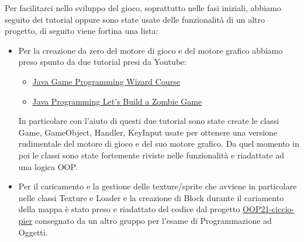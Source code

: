 \documentclass[a4paper,12pt]{report}
\begin{document}
Per facilitarci nello sviluppo del gioco, soprattutto nelle fasi iniziali, abbiamo seguito dei tutorial oppure sono state usate delle funzionalità di un altro progetto, di seguito viene fortina una lista:
\begin{itemize}
	\item Per la creazione da zero del motore di gioco e del motore grafico abbiamo preso spunto da due tutorial presi da Youtube: 
	 \begin{itemize}
	 	\item \href{https://www.youtube.com/playlist?list=PLWms45O3n--5vDnNd6aiu1CSWX3JlCU1n}{Java Game Programming Wizard Course}
	 	\item \href{https://www.youtube.com/playlist?list=PLWms45O3n--5vv69_AlMw23O1Z31CaW1F}{Java Programming Let's Build a Zombie Game}
	 \end{itemize}
	 In particolare con l'aiuto di questi due tutorial sono state create le classi Game, GameObject, Handler, KeyInput usate per ottenere una versione rudimentale del motore di gioco e del suo motore grafico.
	 Da quel momento in poi le classi sono state fortemente riviste nelle funzionalità e riadattate ad una logica OOP.
	 
	 \item Per il caricamento e la gestione delle texture/sprite che avviene in particolare nelle classi Texture e Loader e la creazione di Block durante il cariamento della mappa è stato preso e riadattato del codice dal progetto 
	 \href{https://github.com/Valdi1111/OOP21-ciccio-pier}{OOP21-ciccio-pier} consegnato da un altro gruppo per l'esame di Programmazione ad Oggetti.
	 
\end{itemize}

\paragraph{}
\paragraph{}
\paragraph{}
\paragraph{}
\paragraph{}
\end{document}
